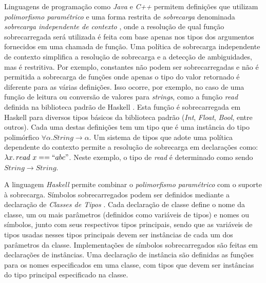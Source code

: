 Linguagens de programa\c{c}\~ao como \emph{Java} e \emph{C++} permitem
defini\c{c}\~oes que utilizam \emph{polimorfismo param\'etrico} e uma
forma restrita de \emph{sobrecarga} denominada \emph{sobrecarga independente de contexto} \cite{Watt90}, 
onde a resolu\c{c}\~ao
de qual fun\c{c}\~ao sobrecarregada ser\'a utilizada \'e feita com base apenas nos tipos dos argumentos
 fornecidos em uma chamada de fun\c{c}\~ao. 
Uma pol\'itica de sobrecarga independente de contexto simplifica a resolu\c{c}\~ao de sobrecarga e a detec\c{c}\~ao de
ambiguidades, mas \'e restritiva. Por exemplo, constantes n\~ao podem ser sobrecarregadas e n\~ao \'e permitida a 
sobrecarga de fun\c{c}\~oes onde apenas o tipo do valor retornado \'e diferente para as v\'arias defini\c{c}\~oes.
Isso ocorre, por exemplo, no caso de uma fun\c{c}\~ao de leitura ou convers\~ao de valores para \emph{strings}, como
a fun\c{c}\~ao \emph{read} definida na biblioteca padr\~ao de Haskell \cite{Haskell98}. Esta fun\c{c}\~ao \'e
sobrecarregada em Haskell para diversos tipos b\'asicos da biblioteca padr\~ao (\emph{Int}, \emph{Float}, \emph{Bool},
entre outros). Cada uma destas defini\c{c}\~oes tem um tipo que \'e uma inst\^ancia do tipo polim\'orfico 
$\forall\alpha.String\rightarrow\alpha$. Um sistema de tipos que adote uma pol\'itica dependente do contexto permite a 
resolu\c{c}\~ao de sobrecarga em declara\c{c}\~oes como: $\lambda x.\,read\,\,x ==``abc"$. Neste exemplo, o tipo de 
\emph{read} \'e determinado como sendo $String\rightarrow String$. 

A linguagem \emph{Haskell} permite combinar o \emph{polimorfismo param\'etrico} com o suporte \`a sobrecarga.
S\'imbolos sobrecarregados podem ser definidos mediante a declara\c{c}\~ao de \emph{Classes de Tipos} \cite{Wadler89}.
Cada declara\c{c}\~ao de classe define o nome da classe, um ou mais par\^ametros 
(definidos como vari\'aveis de tipos) e nomes ou s\'imbolos,
junto com seus respectivos tipos principais, sendo que as vari\'aveis de tipos usadas nesses tipos principais devem ser 
inst\^ancias de cada um dos par\^ametros da classe. Implementa\c{c}\~oes de s\'imbolos sobrecarregados 
s\~ao feitas em declara\c{c}\~oes de inst\^ancias. Uma declara\c{c}\~ao de inst\^ancia s\~ao definidas as fun\c{c}\~oes
para os nomes especificados em uma classe, com tipos que devem ser inst\^ancias do tipo
principal especificado na classe.


